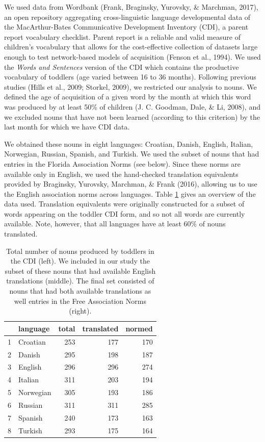 \documentclass[10pt, letterpaper]{article}
\begin{document}
We used data from Wordbank (Frank, Braginsky, Yurovsky, \& Marchman,
2017), an open repository aggregating cross-linguistic language
developmental data of the MacArthur-Bates Communicative Development
Inventory (CDI), a parent report vocabulary checklist. Parent report is
a reliable and valid measure of children's vocabulary that allows for
the cost-effective collection of datasets large enough to test
network-based models of acquisition (Fenson et al., 1994). We used the
\emph{Words and Sentences} version of the CDI which contains the
productive vocabulary of toddlers (age varied between 16 to 36 months).
Following previous studies (Hills et al., 2009; Storkel, 2009), we
restricted our analysis to nouns. We defined the age of acquisition of a
given word by the month at which this word was produced by at least 50\%
of children (J. C. Goodman, Dale, \& Li, 2008), and we excluded nouns
that have not been learned (according to this criterion) by the last
month for which we have CDI data.

We obtained these nouns in eight languages: Croatian, Danish, English,
Italian, Norwegian, Russian, Spanish, and Turkish. We used the subset of
nouns that had entries in the Florida Association Norms (see below).
Since these norms are available only in English, we used the
hand-checked translation equivalents provided by Braginsky, Yurovsky,
Marchman, \& Frank (2016), allowing us to use the English association
norms across languages. Table \ref{tab:stats} gives an overview of the
data used. Translation equivalents were originally constructed for a
subset of words appearing on the toddler CDI form, and so not all words
are currently available. Note, however, that all languages have at least
60\% of nouns translated.

\begin{table}[H]
\centering
\begin{tabular}{rlrrr}
  \hline
 & language & total & translated & normed \\ 
  \hline
1 & Croatian & 253 & 177 & 170 \\ 
  2 & Danish & 295 & 198 & 187 \\ 
  3 & English & 296 & 296 & 274 \\ 
  4 & Italian & 311 & 203 & 194 \\ 
  5 & Norwegian & 305 & 193 & 186 \\ 
  6 & Russian & 311 & 311 & 285 \\ 
  7 & Spanish & 240 & 173 & 163 \\ 
  8 & Turkish & 293 & 175 & 164 \\ 
   \hline
\end{tabular}
\caption{\label{tab:stats}Total number of nouns produced by toddlers in the CDI (left). We included in our study the subset of these nouns that had available English translations (middle). The final set consisted of nouns that had both available translations as well entries in the Free Association Norms (right).} 
\end{table}
\end{document}
